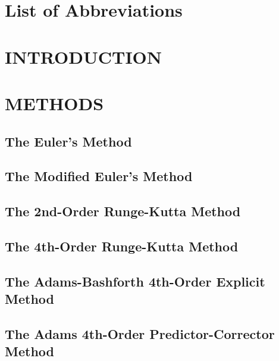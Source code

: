 \documentclass[12pt,oneside]{book}
\begin{document}
	\frontmatter
	
	
		
	\tableofcontents
	
	\chapter*{List of Abbreviations}
	

	\mainmatter
	
	\chapter{INTRODUCTION}
	
	
	
	\chapter{METHODS}
	\section{The Euler's Method}
	
	
	\section{The Modified Euler's Method}
	
	
	\section{The 2nd-Order Runge-Kutta Method}
	
	
	\section{The 4th-Order Runge-Kutta Method}
	
	
	\section{The Adams-Bashforth 4th-Order Explicit Method}
	
	
	\section{The Adams 4th-Order Predictor-Corrector Method}
	
\end{document}
